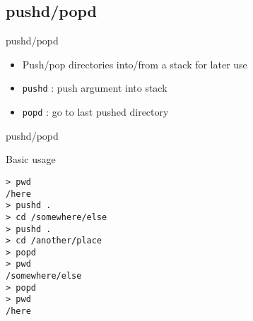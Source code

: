 \subsection{pushd/popd}

\begin{frame}[fragile]{pushd/popd}
  \begin{itemize}
    \pause \item Push/pop directories into/from a stack for later use
    \pause \item \texttt{pushd} : push argument into stack
    \pause \item \texttt{popd} : go to last pushed directory
  \end{itemize}
\end{frame}

\begin{frame}[fragile]{pushd/popd}
  \begin{exampleblock}{Basic usage}
    \begin{lstlisting}[showstringspaces=false,basicstyle=\tiny]
> pwd
/here
> pushd .
> cd /somewhere/else
> pushd .
> cd /another/place
> popd
> pwd
/somewhere/else
> popd
> pwd
/here
    \end{lstlisting}
  \end{exampleblock}
\end{frame}


